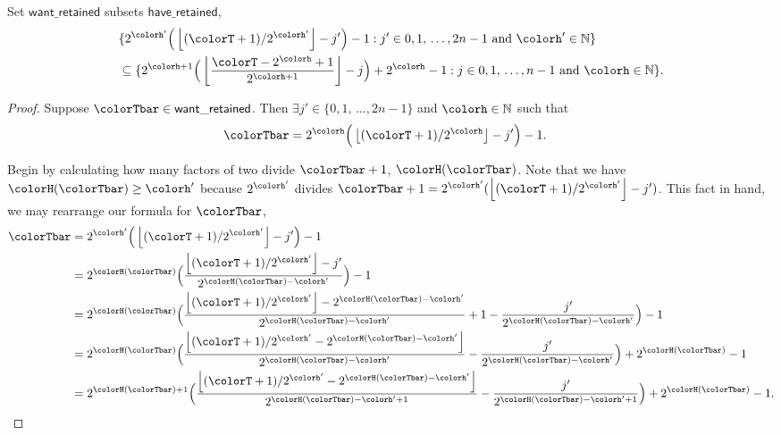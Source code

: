 \begin{sublemma}
\label{thm:tilted-subsetr}
Set $\mathsf{want\_retained}$ subsets $\mathsf{have\_retained}$,
\begin{align*}
&\{
  2^{\colorh'}\Big(\left\lfloor (\colorT + 1) / 2^{\colorh'} \right\rfloor - j'\Big) - 1
  :
  j' \in 0,1,\,\ldots,2n-1
  \text{ and }
  \colorh' \in \mathbb{N}
\}\\
&\subseteq
\{
  2^{\colorh + 1}\Big( \left\lfloor\frac{\colorT - 2^{\colorh} + 1}{2^{\colorh + 1}} \right\rfloor - j\Big) + 2^{\colorh} - 1
  :
  j \in 0,1,\,\ldots,n-1
  \text{ and }
  \colorh \in \mathbb{N}
\}.
\end{align*}

\end{sublemma}
\begin{proof}
Suppose $\colorTbar \in \mathsf{want\_retained}$.
Then $\exists j' \in \{0,1,\,\ldots,2n - 1\}$ and $\colorh \in \mathbb{N}$ such that
\begin{align*}
\colorTbar
&= 2^{\colorh}\Big(\left\lfloor (\colorT + 1) / 2^{\colorh} \right\rfloor - j'\Big) - 1.
\end{align*}

Begin by calculating how many factors of two divide $\colorTbar + 1$, $\colorH(\colorTbar)$.
Note that we have $\colorH(\colorTbar) \geq \colorh'$ because $2^{\colorh'}$ divides $\colorTbar + 1 = 2^{\colorh'}(\left\lfloor (\colorT + 1) / 2^{\colorh'} \right\rfloor - j')$.
This fact in hand, we may rearrange our formula for $\colorTbar$,
\begin{align*}
\colorTbar
&= 2^{\colorh'}\Big(\left\lfloor (\colorT + 1) / 2^{\colorh'} \right\rfloor - j'\Big) - 1\\
&= 2^{\colorH(\colorTbar)} \Big(
\frac{\left\lfloor (\colorT + 1) / 2^{\colorh'} \right\rfloor - j'}{2^{\colorH(\colorTbar) - \colorh'}}
\Big)
- 1\\
&= 2^{\colorH(\colorTbar)} \Big(
\frac{\left\lfloor (\colorT + 1) / 2^{\colorh'} \right\rfloor - 2^{\colorH(\colorTbar) - \colorh'}}{2^{\colorH(\colorTbar) - \colorh'}}
+ 1
- \frac{j'}{2^{\colorH(\colorTbar) - \colorh'}}
\Big)
- 1\\
&= 2^{\colorH(\colorTbar)} \Big(
\frac{\left\lfloor (\colorT + 1) / 2^{\colorh'} - 2^{\colorH(\colorTbar) - \colorh'} \right\rfloor}{2^{\colorH(\colorTbar) - \colorh'}}
- \frac{j'}{2^{\colorH(\colorTbar) - \colorh'}}
\Big)
+ 2^{\colorH(\colorTbar)}
- 1\\
&= 2^{\colorH(\colorTbar) + 1} \Big(
\frac{\left\lfloor (\colorT + 1)/ 2^{\colorh'} - 2^{\colorH(\colorTbar) - \colorh'} \right\rfloor}{2^{\colorH(\colorTbar) - \colorh' + 1}}
- \frac{j'}{2^{\colorH(\colorTbar) - \colorh' + 1}}
\Big)
+ 2^{\colorH(\colorTbar)}
- 1.
\end{align*}


\end{proof}
